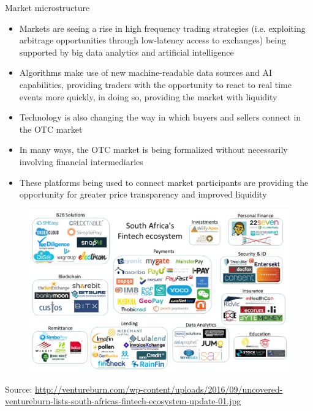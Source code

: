 \documentclass[11pt]{beamer}
\begin{document}

\begin{frame}{Market microstructure}
	\begin{itemize}
		\item Markets are seeing a rise in high frequency trading strategies (i.e. exploiting arbitrage opportunities through low-latency access to exchanges) being supported by big data analytics and artificial intelligence
		\item Algorithms make use of new machine-readable data sources and AI capabilities, providing traders with the opportunity to react to real time events more quickly, in doing so, providing the market with liquidity
		\item Technology is also changing the way in which buyers and sellers connect in the OTC market
		\item In many ways, the OTC market is being formalized without necessarily involving financial intermediaries
		\item These platforms being used to connect market participants are providing the opportunity for greater price transparency and improved liquidity
	\end{itemize}
\end{frame}


\begin{frame}
	\begin{figure}[]
		\centering
		\includegraphics  [scale=0.2]{Images/ecosystem}
	\end{figure}
	\begin{tiny}
		Source: \href{http://ventureburn.com/2016/09/uncovered-ventureburn-lists-south-africas-fintech-ecosystem/}{http://ventureburn.com/wp-content/uploads/2016/09/uncovered-ventureburn-lists-south-africas-fintech-ecosystem-update-01.jpg}
	\end{tiny}
\end{frame}
\end{document}
